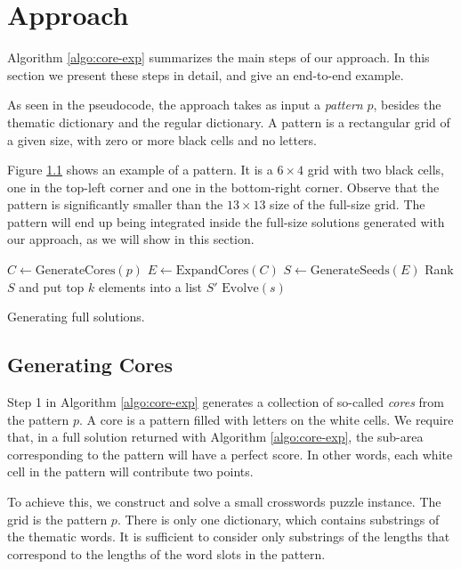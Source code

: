 \section{Approach}

Algorithm \ref{algo:core-exp} summarizes the main steps of our approach.
In this section we present these steps in detail, and give an end-to-end example.

As seen in the pseudocode, the approach takes as input a \emph{pattern} $p$, besides
the thematic dictionary and the regular dictionary.
A {pattern} is a rectangular grid of a given size, with zero or more black cells and no letters.

Figure \ref{} shows an example of a pattern. It is a $6 \times 4$ grid with two black cells, one in the top-left corner and one in the bottom-right corner.
Observe that the pattern is significantly smaller than the $13 \times 13$ size of the full-size grid.
The pattern will end up being integrated inside the full-size solutions generated with our approach,
as we will show in this section.

\begin{algorithm}[t]
\DontPrintSemicolon %
$C \leftarrow \mbox{GenerateCores}(p)$\;
$E \leftarrow \mbox{ExpandCores}(C)$\;
$S \leftarrow \mbox{GenerateSeeds}(E)$\;
Rank $S$ and put top $k$ elements into a list $S'$\;
 {
    $\mbox{Evolve}(s)$\;
}
\caption{{\sc Generating full solutions.}}
\label{algo:core-exp}
\end{algorithm}


\subsection{Generating Cores}

Step 1 in Algorithm \ref{algo:core-exp} generates a collection of so-called \emph{cores} from the pattern $p$.
A core is a pattern filled with letters on the white cells.
We require that, in a full solution returned with Algorithm \ref{algo:core-exp}, 
the sub-area corresponding to the pattern will have a perfect score.
In other words, each white cell in the pattern will contribute two points.

To achieve this, we construct and solve a small crosswords puzzle instance.
The grid is the pattern $p$. There is only one dictionary, which contains 
substrings of the thematic words.
It is sufficient to consider only substrings of the lengths that 
correspond to the lengths of the word slots in the pattern.

